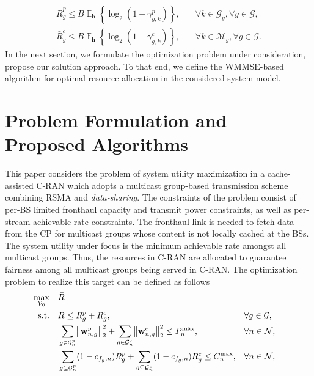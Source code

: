 \documentclass[12pt,draftcls,onecolumn]{IEEEtran}
\DeclarePairedDelimiter\norm{\lVert}{\rVert}
\theoremstyle{remark}
\DeclareMathOperator{\EX}{\mathbb{E}}%
\theoremstyle{definition}
\begin{document}
{	\begin{align}
	\label{eq:e2.22}
	\bar{R}_{g}^{p} \leq B\EX_{\mathbf{h}}\left\lbrace  \log_2\left(1 + \gamma_{g,k}^p\right)\right\rbrace,  &\quad  \forall k \in \mathcal{G}_g, \forall g \in \mathcal{G}, \\
	\label{eq:e2.23}
	\bar{R}_{g}^{c} \leq B\EX_{\mathbf{h}}\left\lbrace \log_2\left(1 + \gamma_{g, k}^c\right)\right\rbrace,  &\quad \forall k \in \mathcal{M}_g, \forall g \in \mathcal{G}.
	\end{align}
	In the next section, we formulate the optimization problem under consideration, propose our solution approach. To that end, we define the WMMSE-based algorithm for optimal resource allocation in the considered system model.
\section{Problem Formulation and Proposed Algorithms}\label{sec:PF}
This paper considers the problem of system utility maximization in a cache-assisted C-RAN which adopts a multicast group-based transmission scheme combining RSMA and \emph{data-sharing}. The constraints of the problem consist of per-BS limited fronthaul capacity and transmit power constraints, as well as per-stream achievable rate constraints. The fronthaul link is needed to fetch data from the CP for multicast groups whose content is not locally cached at the BSs. The system utility under focus is the minimum achievable rate amongst all multicast groups. Thus, the resources in C-RAN are allocated to guarantee fairness among all multicast groups being served in C-RAN. The optimization problem to realize this target can be defined as follows
\begin{subequations}\label{eq:Opt0}
	\begin{align}
		\underset{\mathcal{V}_0}{\text{max}}\quad &\bar{R}  \\
		\text{s.t.} \quad & \bar{R} \leq \bar{R}_g^p + \bar{R}_g^c,  && \forall g \in \mathcal{G}, \label{eq:R1} \\
		&\sum_{{g \in \mathcal{G}_n^p}}\norm[\big]{\mathbf{w}_{n ,g}^{p}}_2^2  + \sum_{{g \in \mathcal{G}_n^c}}\norm[\big]{\mathbf{w}_{n ,g}^{c}}_2^2\leq P_{n}^{\text{max}},  &&\forall n \in \mathcal{N}, \label{eq:pmax1}\\
		&\sum_{{g \subseteq \mathcal{G}_n^p}}(1-c_{f_g, n})\bar{R}_{g}^{p} + \sum_{{g \subseteq \mathcal{G}_n^c}} (1-c_{f_g, n}) \bar{R}_{g}^{c} \leq C_n^{\text{max}}, &&\forall n \in \mathcal{N}, \label{eq:fn1}\\

\end{align}
\end{subequations}}
\end{document}
